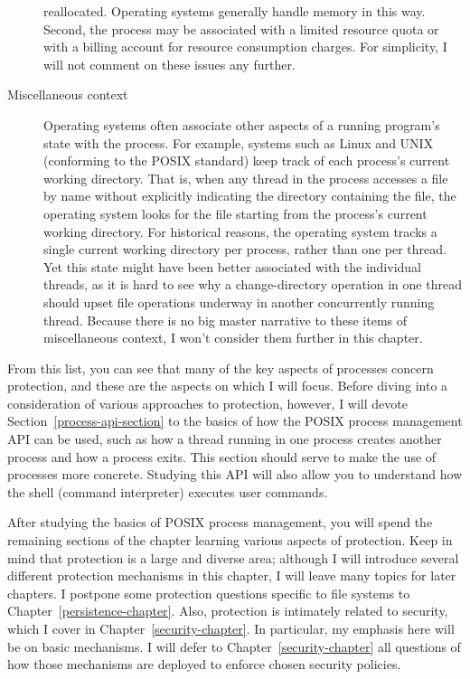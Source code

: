 \begin{description}
reallocated.  Operating systems generally handle memory
in this way.  Second, the process may be associated with a
limited resource quota or with a billing account for resource
consumption charges.  For simplicity, I will not comment on these
issues any further.
\item[Miscellaneous context] Operating systems often associate other
aspects of a running program's state with the process.  For example,
systems such as Linux and UNIX (conforming to the POSIX standard) keep
track of each process's current working directory.  That is, when any
thread in the process accesses a file by name without
explicitly indicating the directory containing the file,
the operating system looks for the file starting from the process's
current working directory.  For historical reasons, the operating
system tracks a single current working
directory per process, rather than one per thread.  Yet this state
might have been better associated with the individual threads, as it
is hard to see why a change-directory operation in one thread should upset file
operations underway in another concurrently running thread.  Because there is no
big master narrative to these items of miscellaneous context, I won't consider
them further in this chapter.
\end{description}

From this list, you can see that many of the key aspects of processes
concern protection, and these are the aspects on which I will focus.
Before diving into a consideration of various approaches to
protection, however, I will devote Section~\ref{process-api-section}
to the basics of how the POSIX process management API can be used,
such as how a thread running in one process
creates another process and how a process exits.  This section should
serve to make the use of processes more concrete.  Studying this API
will also allow you to
understand how the shell (command interpreter)
executes user commands.

After studying the basics of POSIX process management, you will spend
the remaining sections of the chapter learning various aspects of
protection.  Keep in mind that protection is a large and diverse area;
although I will introduce several different protection mechanisms in
this chapter, I will leave many topics for later chapters.  I
postpone some protection questions specific to file
systems to Chapter~\ref{persistence-chapter}.
Also, protection is intimately related to security, which I
cover in  Chapter~\ref{security-chapter}.  In particular, my emphasis
here will be on basic mechanisms.
I will defer to  Chapter~\ref{security-chapter} all questions of how
those mechanisms are deployed to enforce chosen security policies.

